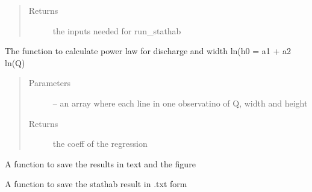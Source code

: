 \documentclass[letterpaper,10pt,english]{sphinxmanual}
\begin{document}
\begin{fulllineitems}
\begin{fulllineitems}
\begin{quote}
\begin{description}
\begin{itemize}
\end{itemize}

\item[{Returns}] \leavevmode
the inputs needed for run\_stathab

\end{description}\end{quote}

\end{fulllineitems}


\begin{fulllineitems}
\label{\detokenize{index:src.stathab_c.Stathab.power_law}}
The function to calculate power law for discharge and width
ln(h0 = a1 + a2 ln(Q)
\begin{quote}\begin{description}
\item[{Parameters}] \leavevmode
{} -- an array where each line in one observatino of Q, width and height

\item[{Returns}] \leavevmode
the coeff of the regression

\end{description}\end{quote}

\end{fulllineitems}


\begin{fulllineitems}
\label{\detokenize{index:src.stathab_c.Stathab.savefig_stahab}}
A function to save the results in text and the figure

\end{fulllineitems}


\begin{fulllineitems}
\label{\detokenize{index:src.stathab_c.Stathab.savetxt_stathab}}
A function to save the stathab result in .txt form

\end{fulllineitems}



\end{fulllineitems}
\end{document}
